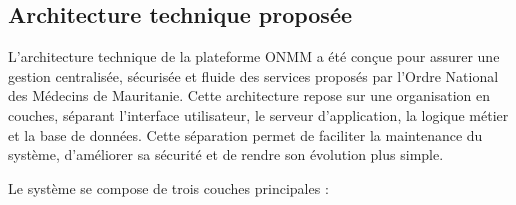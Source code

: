 ﻿\documentclass[12pt,a4paper]{report}
\begin{document}



\subsection{Architecture technique proposée}

L'architecture technique de la plateforme ONMM a été conçue pour assurer une
gestion centralisée, sécurisée et fluide des services proposés par l'Ordre
National des Médecins de Mauritanie. Cette architecture repose sur une
organisation en couches, séparant l'interface utilisateur, le serveur
d'application, la logique métier et la base de données. Cette séparation permet
de faciliter la maintenance du système, d'améliorer sa sécurité et de rendre son
évolution plus simple.

Le système se compose de trois couches principales :
\end{document}

